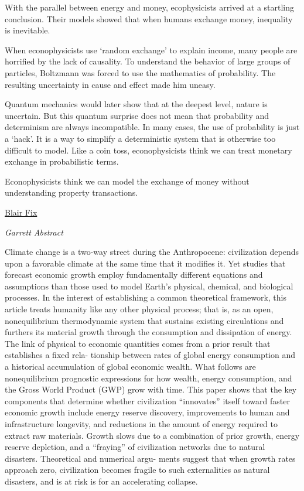 \documentclass[
]{book}
\begin{document}
With the parallel between energy and money, ecophysicists arrived at a startling conclusion.
Their models showed that when humans exchange money, inequality is inevitable.

When econophysicists use `random exchange' to explain income,
many people are horrified by the lack of causality.
To understand the behavior of large groups of particles,
Boltzmann was forced to use the mathematics of probability.
The resulting uncertainty in cause and effect made him uneasy.

Quantum mechanics would later show that at the deepest level, nature is uncertain.
But this quantum surprise does not mean that probability and determinism are always incompatible.
In many cases, the use of probability is just a `hack'.
It is a way to simplify a deterministic system that is otherwise too difficult to model.
Like a coin toss, econophysicists think we can treat monetary exchange in probabilistic terms.

Econophysicists think we can model the exchange of money without understanding property transactions.

\href{https://economicsfromthetopdown.com/2021/03/12/energizing-exchange-learning-from-econophysics-mistakes/}{Blair Fix}

\emph{Garrett Abstract}

Climate change is a two-way street during the Anthropocene: civilization depends upon a
favorable climate at the same time that it modiﬁes it. Yet studies that forecast economic growth employ
fundamentally diﬀerent equations and assumptions than those used to model Earth's physical, chemical,
and biological processes. In the interest of establishing a common theoretical framework, this article treats
humanity like any other physical process; that is, as an open, nonequilibrium thermodynamic system that
sustains existing circulations and furthers its material growth through the consumption and dissipation of
energy. The link of physical to economic quantities comes from a prior result that establishes a ﬁxed rela-
tionship between rates of global energy consumption and a historical accumulation of global economic
wealth. What follows are nonequilibrium prognostic expressions for how wealth, energy consumption,
and the Gross World Product (GWP) grow with time. This paper shows that the key components that
determine whether civilization ``innovates'' itself toward faster economic growth include energy reserve
discovery, improvements to human and infrastructure longevity, and reductions in the amount of energy
required to extract raw materials. Growth slows due to a combination of prior growth, energy reserve
depletion, and a ``fraying'' of civilization networks due to natural disasters. Theoretical and numerical argu-
ments suggest that when growth rates approach zero, civilization becomes fragile to such externalities as
natural disasters, and is at risk is for an accelerating collapse.
\end{document}
